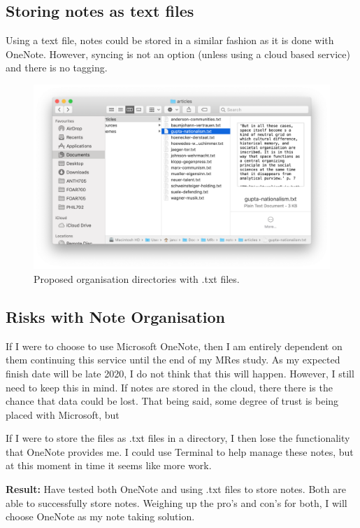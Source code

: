 \documentclass{article}
\begin{document}
\subsection*{Storing notes as text files}

Using a text file, notes could be stored in a similar fashion as it is done with OneNote. However, syncing is not an option (unless using a cloud based service) and there is no tagging. 

\begin{figure}[h!]
    \centering
    \includegraphics[width=\textwidth]{text.png}
    \caption{Proposed organisation directories with .txt files.}
    \label{fig:my_label}
\end{figure}

\subsection*{Risks with Note Organisation}

If I were to choose to use Microsoft OneNote, then I am entirely dependent on them continuing this service until the end of my MRes study. As my expected finish date will be late 2020, I do not think that this will happen. However, I still need to keep this in mind. If notes are stored in the cloud, there there is the chance that data could be lost. That being said, some degree of trust is being placed with Microsoft, but 

If I were to store the files as .txt files in a directory, I then lose the functionality that OneNote provides me. I could use Terminal to help  manage these notes, but at this moment in time it seems like more work.

\textbf{Result:} Have tested both OneNote and using .txt files to store notes. Both are able to successfully store notes. Weighing up the pro's and con's for both, I will choose OneNote as my note taking solution. 
\end{document}
